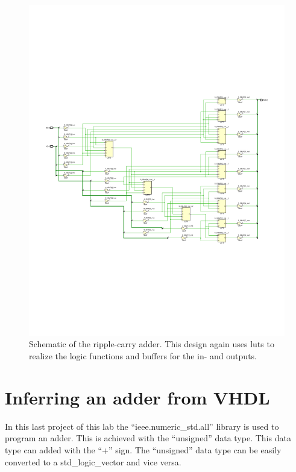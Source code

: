 \begin{figure}[h]
	\centering
	\includegraphics[width=\linewidth, trim=0mm 70mm 0mm 70mm]{./L1/E5/schematic.pdf}
	\caption{Schematic of the ripple-carry adder. This design again uses \glspl{lut} to realize the logic functions and buffers for the in- and outputs.}
	\label{fig: Ripple-carry adder schematic}
\end{figure}



\section{Inferring an adder from VHDL}

In this last project of this lab the ``ieee.numeric\_std.all'' library is used to program an adder. This is achieved with the ``unsigned'' data type. This data type can added with the ``+'' sign. The ``unsigned'' data type can be easily converted to a std\_logic\_vector and vice versa. 

